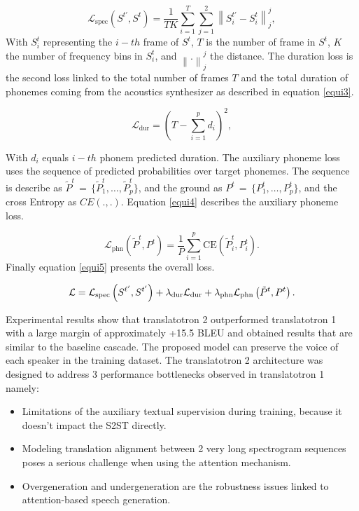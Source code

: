 \documentclass[12pt]{article}
\begin{document}
\begin{equation}
\mathcal{L}_{\text{spec}} \left( S^{t'}, S^t \right) = \frac{1}{T K} \sum_{i=1}^T \sum_{j=1}^2 \left\| S_i^{t'} - S_i^t \right\|_j^j,
\label{equi2}
\end{equation}
With $S^{t}_{i}$ representing the $i-th$ frame of $S^{t}$, $T$ is the number of frame in $S^{t}$, $K$ the number of frequency bins in $S^{t}_{i}$, and $\left\|.  \right\|^{j}_{j}$ the distance. The duration loss is the second loss linked to the total number of frames $T$ and the total duration of phonemes coming from the acoustics synthesizer as described in equation \ref{equi3}.

\begin{equation}
\mathcal{L}_{\text{dur}} = \left( T - \sum_{i=1}^p d_i \right)^2,
\label{equi3}
\end{equation}

With $d_{i}$ equals $i-th$ phonem predicted duration. The auxiliary phoneme loss uses the sequence of predicted probabilities over target phonemes. The sequence is describe as $\tilde{P}^{t} \, = \, \{ \tilde{P}_{1}^{t}, \ldots, \tilde{P}_{p}^{t} \}$, and the ground as ${P}^{t} \, = \, \{ {P}_{1}^{t}, \ldots, {P}_{p}^{t} \}$, and the cross Entropy as $CE(.,.)$. Equation \ref{equi4} describes the auxiliary phoneme loss.

\begin{equation}
\mathcal{L}_{\mathrm{phn}}\left(\tilde{P}^{t},P^{t}\right)=\frac{1}{P}\sum_{i=1}^{p}\mathrm{CE}\left(\tilde{P}_{i}^{t},P_{i}^{t}\right).
\label{equi4}
\end{equation}
Finally equation \ref{equi5} presents the overall loss.

\begin{equation}
{\cal L} = {\cal L}_{\rm spec}\left(S^{\ell'}, S^{t'}\right) + \lambda_{\rm dur} {\cal L}_{\rm dur} + \lambda_{\rm phn} {\cal L}_{\rm phn}\left(\tilde{P}^{t}, P^{t}\right).
\label{equi5}
\end{equation}

Experimental results show that translatotron 2 outperformed translatotron 1 with a large margin of approximately +15.5 BLEU and obtained results that are similar to the baseline cascade. The proposed model can preserve the voice of each speaker in the training dataset. The translatotron 2 architecture was designed to address 3 performance bottlenecks observed in translatotron 1 namely:
\begin{itemize}
\item  Limitations of the auxiliary textual supervision during training, because it doesn't impact the S2ST directly. 
\item Modeling translation alignment between 2 very long spectrogram sequences poses a serious challenge when using the attention mechanism.  
\item Overgeneration and undergeneration are the robustness issues linked to attention-based speech generation.
\end{itemize}
\end{document}
